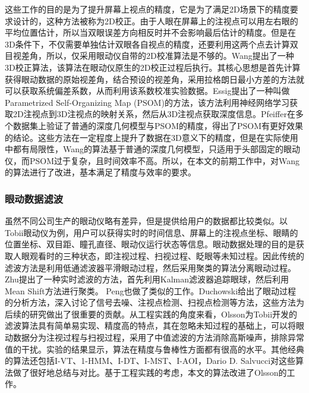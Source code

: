 这些工作的目的是为了提升屏幕上视点的精度，它是为了满足2D场景下的精度要求设计的，这种方法被称为2D校正。由于人眼在屏幕上的注视点可以用左右眼的平均位置估计，所以当双眼误差方向相反时并不会影响最后估计的精度。但是在3D条件下，不仅需要单独估计双眼各自视点的精度，还要利用这两个点去计算双目视差角，所以，仅采用眼动仪自带的2D校准算法是不够的。Wang提出了一种3D校正算法\parencite{wang2014online}，该算法在眼动仪原生的2D校正过程后执行。其核心思想是首先计算获得眼动数据的原始视差角，结合预设的视差角，采用拉格朗日最小方差的方法就可以获取系统偏差系数，从而利用该系数校准实验数据。Essig提出了一种叫做Parametrized Self-Organizing Map (PSOM)的方法\parencite{essig2006neural}，该方法利用神经网络学习获取2D注视点到3D注视点的映射关系，然后从3D注视点获取深度信息。Pfeiffer在多个数据集上验证了普通的深度几何模型与PSOM的精度，得出了PSOM有更好效果的结论\parencite{pfeiffer2008evaluation}。这些方法在一定程度上提升了数据在3D意义下的精度，但是在实际使用中都有局限性，Wang的算法基于普通的深度几何模型，只适用于头部固定的眼动仪，而PSOM过于复杂，且时间效率不高。所以，在本文的前期工作中\parencite{ma2015new}，对Wang的算法进行了改进，基本满足了精度与效率的要求。
\subsubsection{眼动数据滤波}
\label{chap1:sec:filter}
虽然不同公司生产的眼动仪略有差异，但是提供给用户的数据都比较类似。以Tobii眼动仪为例，用户可以获得实时的时间信息、屏幕上的注视点坐标、眼睛的位置坐标、双目距、瞳孔直径、眼动仪运行状态等信息。眼动数据处理的目的是获取人眼观看时的三种状态，即注视过程、扫视过程、眨眼等未知过程。因此传统的滤波方法是利用低通滤波器平滑眼动过程，然后采用聚类的算法分离眼动过程。Zhu提出了一种实时滤波的方法\parencite{zhu2002combining}，首先利用Kalman滤波器追踪眼球，然后利用Mean Shift方法进行聚类。
Peng也做了类似的工作\parencite{peng2005mean}。Duchowski给出了眼动过程的分析方法\parencite{duchowski2007eye}，深入讨论了信号去噪、注视点检测、扫视点检测等方法，这些方法为后续的研究做出了很重要的贡献。从工程实践的角度来看，Olsson为Tobii开发的滤波算法\parencite{olsson2007real}具有简单易实现、精度高的特点，其在忽略未知过程的基础上，可以将眼动数据分为注视过程与扫视过程，采用了中值滤波的方法消除高斯噪声，排除异常值的干扰。实验的结果显示，算法在精度与鲁棒性方面都有很高的水平。其他经典的算法还包括I-VT、1-HMM、I-DT、I-MST、I-AOI，Dario D. Salvucci对这些算法做了很好地总结与对比\parencite{salvucci2000identifying}。基于工程实践的考虑，本文的算法改进了Olsson的工作。

